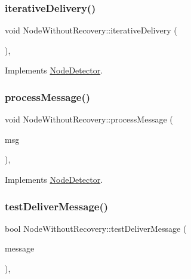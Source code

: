 \subsubsection{\texorpdfstring{iterative\+Delivery()}{iterativeDelivery()}}
{\footnotesize\ttfamily void Node\+Without\+Recovery\+::iterative\+Delivery (\begin{DoxyParamCaption}{ }\end{DoxyParamCaption})\hspace{0.3cm}{\ttfamily [protected]}, {\ttfamily [virtual]}}



Implements \hyperlink{class_node_detector_a17ecf9939fce7471f4513b66185743cc}{Node\+Detector}.

\mbox{\label{class_node_without_recovery_a0b44132b4ebc650399711766cb050399}} 
\subsubsection{\texorpdfstring{process\+Message()}{processMessage()}}
{\footnotesize\ttfamily void Node\+Without\+Recovery\+::process\+Message (\begin{DoxyParamCaption}\item[{c\+Message $\ast$}]{msg }\end{DoxyParamCaption})\hspace{0.3cm}{\ttfamily [protected]}, {\ttfamily [virtual]}}



Implements \hyperlink{class_node_detector_ab69432c6d3327a684845ec231826727e}{Node\+Detector}.

\mbox{\label{class_node_without_recovery_a8cf83ec6d0af26e385dcde0bc03f5b6d}} 
\subsubsection{\texorpdfstring{test\+Deliver\+Message()}{testDeliverMessage()}}
{\footnotesize\ttfamily bool Node\+Without\+Recovery\+::test\+Deliver\+Message (\begin{DoxyParamCaption}\item[{const \hyperlink{structures_8h_a7e7bdc1d2fff8a9436f2f352b2711ed6}{message\+Info} \&}]{message }\end{DoxyParamCaption})\hspace{0.3cm}{\ttfamily [protected]}, {\ttfamily [virtual]}}



